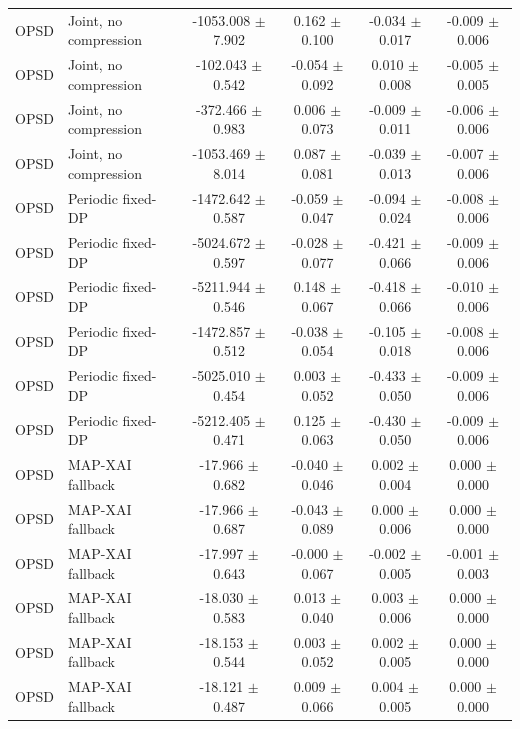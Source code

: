 \begin{table}[t]
\begin{tabular}{llcccc}
OPSD & Joint, no compression & -1053.008 $\pm$ 7.902 & 0.162 $\pm$ 0.100 & -0.034 $\pm$ 0.017 & -0.009 $\pm$ 0.006 \\
OPSD & Joint, no compression & -102.043 $\pm$ 0.542 & -0.054 $\pm$ 0.092 & 0.010 $\pm$ 0.008 & -0.005 $\pm$ 0.005 \\
OPSD & Joint, no compression & -372.466 $\pm$ 0.983 & 0.006 $\pm$ 0.073 & -0.009 $\pm$ 0.011 & -0.006 $\pm$ 0.006 \\
OPSD & Joint, no compression & -1053.469 $\pm$ 8.014 & 0.087 $\pm$ 0.081 & -0.039 $\pm$ 0.013 & -0.007 $\pm$ 0.006 \\
OPSD & Periodic fixed-DP & -1472.642 $\pm$ 0.587 & -0.059 $\pm$ 0.047 & -0.094 $\pm$ 0.024 & -0.008 $\pm$ 0.006 \\
OPSD & Periodic fixed-DP & -5024.672 $\pm$ 0.597 & -0.028 $\pm$ 0.077 & -0.421 $\pm$ 0.066 & -0.009 $\pm$ 0.006 \\
OPSD & Periodic fixed-DP & -5211.944 $\pm$ 0.546 & 0.148 $\pm$ 0.067 & -0.418 $\pm$ 0.066 & -0.010 $\pm$ 0.006 \\
OPSD & Periodic fixed-DP & -1472.857 $\pm$ 0.512 & -0.038 $\pm$ 0.054 & -0.105 $\pm$ 0.018 & -0.008 $\pm$ 0.006 \\
OPSD & Periodic fixed-DP & -5025.010 $\pm$ 0.454 & 0.003 $\pm$ 0.052 & -0.433 $\pm$ 0.050 & -0.009 $\pm$ 0.006 \\
OPSD & Periodic fixed-DP & -5212.405 $\pm$ 0.471 & 0.125 $\pm$ 0.063 & -0.430 $\pm$ 0.050 & -0.009 $\pm$ 0.006 \\
OPSD & MAP-XAI fallback & -17.966 $\pm$ 0.682 & -0.040 $\pm$ 0.046 & 0.002 $\pm$ 0.004 & 0.000 $\pm$ 0.000 \\
OPSD & MAP-XAI fallback & -17.966 $\pm$ 0.687 & -0.043 $\pm$ 0.089 & 0.000 $\pm$ 0.006 & 0.000 $\pm$ 0.000 \\
OPSD & MAP-XAI fallback & -17.997 $\pm$ 0.643 & -0.000 $\pm$ 0.067 & -0.002 $\pm$ 0.005 & -0.001 $\pm$ 0.003 \\
OPSD & MAP-XAI fallback & -18.030 $\pm$ 0.583 & 0.013 $\pm$ 0.040 & 0.003 $\pm$ 0.006 & 0.000 $\pm$ 0.000 \\
OPSD & MAP-XAI fallback & -18.153 $\pm$ 0.544 & 0.003 $\pm$ 0.052 & 0.002 $\pm$ 0.005 & 0.000 $\pm$ 0.000 \\
OPSD & MAP-XAI fallback & -18.121 $\pm$ 0.487 & 0.009 $\pm$ 0.066 & 0.004 $\pm$ 0.005 & 0.000 $\pm$ 0.000 \\
\bottomrule
\end{tabular}
\end{table}
